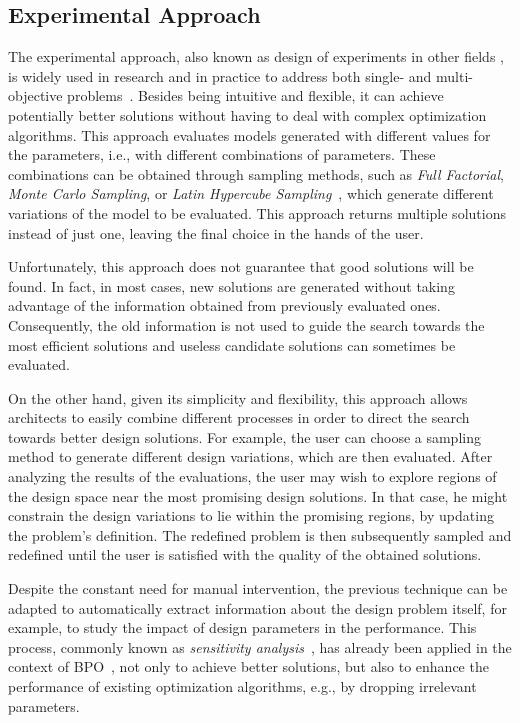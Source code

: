 	\subsection{Experimental Approach}
	\label{ssec:doe}
	
	The experimental approach, also known as design of experiments in other fields \cite{Giunta2003DOE}, is widely used in research and in practice to address both single- and multi-objective problems~\cite{Fang2017}. Besides being intuitive and flexible, it can achieve potentially better solutions without having to deal with complex optimization algorithms. This approach evaluates models generated with different values for the parameters, i.e., with different combinations of parameters. These combinations can be obtained through sampling methods, such as \textit{Full Factorial}, \textit{Monte Carlo Sampling}, or \textit{Latin Hypercube Sampling}~\cite{Giunta2003DOE}, which generate different variations of the model to be evaluated. This approach returns multiple solutions instead of just one, leaving the final choice in the hands of the user.
	
	Unfortunately, this approach does not guarantee that good solutions will be found. In fact, in most cases, new solutions are generated without taking advantage of the information obtained from previously evaluated ones. Consequently, the old information is not used to guide the search towards the most efficient solutions and useless candidate solutions can sometimes be evaluated. 
	
	On the other hand, given its simplicity and flexibility, this approach allows architects to easily combine different processes in order to direct the search towards better design solutions. For example, the user can choose a sampling method to generate different design variations, which are then evaluated. After analyzing the results of the evaluations, the user may wish to explore regions of the design space near the most promising design solutions. In that case, he might constrain the design variations to lie within the promising regions, by updating the problem’s definition. The redefined problem is then subsequently sampled and redefined until the user is satisfied with the quality of the obtained solutions.
	
	Despite the constant need for manual intervention, the previous technique can be adapted to automatically extract information about the design problem itself, for example, to study the impact of design parameters in the performance. This process, commonly known as \textit{sensitivity analysis}~\cite{Saltelli2007}, has already been applied in the context of \ac{BPO}~\cite{Tian2013}, not only to achieve better solutions, but also to enhance the performance of existing optimization algorithms, e.g., by dropping irrelevant parameters.
	

